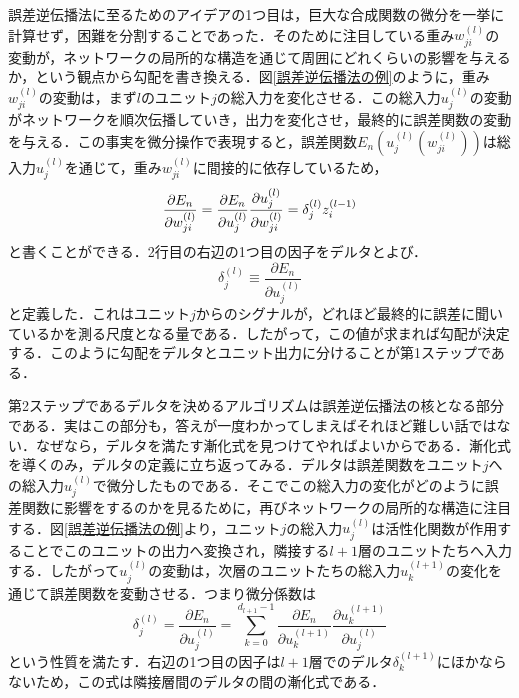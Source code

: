 \documentclass[a4paper,11pt]{jsreport}
\begin{document}
誤差逆伝播法に至るためのアイデアの1つ目は，巨大な合成関数の微分を一挙に計算せず，困難を分割することであった．そのために注目している重み$w_{ji}^{(l)}$の変動が，ネットワークの局所的な構造を通じて周囲にどれくらいの影響を与えるか，という観点から勾配を書き換える．図\ref{誤差逆伝播法の例}のように，重み$w_{ji}^{(l)}$の変動は，まず$l$のユニット$j$の総入力を変化させる．この総入力$u_j^{(l)}$の変動がネットワークを順次伝播していき，出力を変化させ，最終的に誤差関数の変動を与える．この事実を微分操作で表現すると，誤差関数$E_n(u_j^{(l)}(w_{ji}^{(l)}))$は総入力$u_j^{(l)}$を通じて，重み$w_{ji}^{(l)}$に間接的に依存しているため，
\begin{equation}
  \frac{\partial E_n}{\partial w_{ji}^{(l)}}
  = \frac{\partial E_n}{\partial u_j^{(l)}} \frac{\partial u_j^{(l)}}{\partial w_{ji}^{(l)}} \notag \\
  = \delta_j^{(l)} z_i^{(l-1)} \label{ニューラルネットワークパラメータ微分}
\end{equation}
と書くことができる．2行目の右辺の1つ目の因子をデルタとよび．
\begin{equation}
  \delta_j^{(l)}
  \equiv \frac{\partial E_n}{\partial u_j^{(l)}}
\end{equation}
と定義した．これはユニット$j$からのシグナルが，どれほど最終的に誤差に聞いているかを測る尺度となる量である．したがって，この値が求まれば勾配が決定する．このように勾配をデルタとユニット出力に分けることが第1ステップである．\par
第2ステップであるデルタを決めるアルゴリズムは誤差逆伝播法の核となる部分である．実はこの部分も，答えが一度わかってしまえばそれほど難しい話ではない．なぜなら，デルタを満たす漸化式を見つけてやればよいからである．漸化式を導くのみ，デルタの定義に立ち返ってみる．デルタは誤差関数をユニット$j$への総入力$u_j^{(l)}$で微分したものである．そこでこの総入力の変化がどのように誤差関数に影響をするのかを見るために，再びネットワークの局所的な構造に注目する．図\ref{誤差逆伝播法の例}より，ユニット$j$の総入力$u_j^{(l)}$は活性化関数が作用することでこのユニットの出力へ変換され，隣接する$l+1$層のユニットたちへ入力する．したがって$u_j^{(l)}$の変動は，次層のユニットたちの総入力$u_k^{(l+1)}$の変化を通じて誤差関数を変動させる．つまり微分係数は
\begin{equation}
  \delta_j^{(l)}
  = \frac{\partial E_n}{\partial u_j^{(l)}}
  = \sum_{k=0}^{d_{l+1}-1} \frac{\partial E_n}{\partial u_k^{(l+1)}}\frac{\partial u_k^{(l+1)}}{\partial u_j^{(l)}}
\end{equation}
という性質を満たす．右辺の1つ目の因子は$l+1$層でのデルタ$\delta_k^{(l+1)}$にほかならないため，この式は隣接層間のデルタの間の漸化式である．
\end{document}
